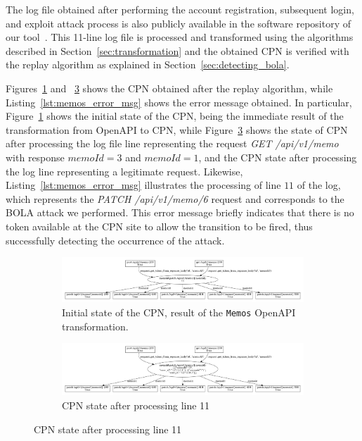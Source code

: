 The log file obtained after performing the account registration, subsequent login, and exploit attack process is also publicly available in the software repository of our tool~\cite{links2cpn}. This 11-line log file is processed and transformed using the algorithms described in Section~\ref{sec:transformation} and the obtained CPN is verified with the replay algorithm as explained in Section~\ref{sec:detecting_bola}.

Figures~\ref{fig:Memos_attack_case_a} and ~\ref{fig:Memos_attack_case_b} shows the CPN obtained after the replay algorithm, while Listing~\ref{lst:memos_error_msg} shows the error message obtained. In particular, Figure~\ref{fig:Memos_attack_case_a} shows the initial state of the CPN, being the immediate result of the transformation from OpenAPI to CPN, while Figure~\ref{fig:Memos_attack_case_b} shows the state of CPN after processing the log file line representing the request \textit{GET /api/v1/memo} with response $memoId=3$ and $memoId=1$, and the CPN state after processing the log line representing a legitimate request. Likewise, Listing~\ref{lst:memos_error_msg} illustrates the processing of line $11$ of the log, which represents the \textit{PATCH /api/v1/memo/6} request and corresponds to the BOLA attack we performed. This error message briefly indicates that there is no token available at the CPN site to allow the transition to be fired, thus successfully detecting the occurrence of the attack.


\begin{figure}
    \center
    \begin{subfigure}{\textwidth}
    \includegraphics[width=\columnwidth]{figures/memos-0-initial-state.pdf}
    \caption{Initial state of the CPN, result of the {\tt Memos} OpenAPI transformation.}
    \label{fig:Memos_attack_case_a}
    \end{subfigure}

    \begin{subfigure}{\textwidth}
    \includegraphics[width=\columnwidth]{figures/memos-line-9-fire-line.pdf}
    \caption{CPN state after processing line 11}
    \label{fig:Memos_attack_case_b}
    \end{subfigure}
\end{figure}

